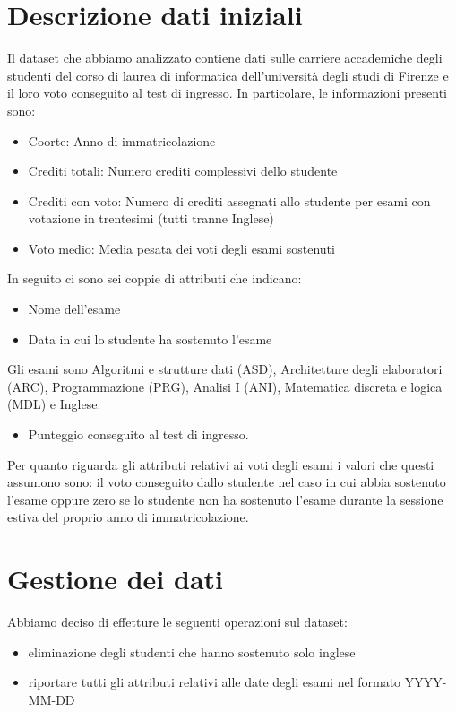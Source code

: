 \documentclass[12pt]{article}
\begin{document}
\section{Descrizione dati iniziali}
Il dataset che abbiamo analizzato contiene dati sulle carriere accademiche degli studenti del corso di laurea di informatica dell'università degli studi di Firenze e il loro voto conseguito 
al test di ingresso. 
In particolare, le informazioni presenti sono:
\begin{itemize}
	\item Coorte: Anno di immatricolazione
	\item Crediti totali: Numero crediti complessivi dello studente
	\item Crediti con voto: Numero di crediti assegnati allo studente per esami con votazione in trentesimi (tutti tranne Inglese)
	\item Voto medio: Media pesata dei voti degli esami sostenuti
\end{itemize}
In seguito ci sono sei coppie di attributi che indicano:
\begin{itemize}
	\item Nome dell'esame
	\item Data in cui lo studente ha sostenuto l'esame
\end{itemize}
Gli esami sono Algoritmi e strutture dati (ASD), Architetture degli elaboratori (ARC), Programmazione (PRG), Analisi I (ANI), Matematica discreta e logica (MDL) e Inglese.
\begin{itemize}
	\item Punteggio conseguito al test di ingresso.
\end{itemize}
Per quanto riguarda gli attributi relativi ai voti degli esami i valori che questi assumono sono:
il voto conseguito dallo studente nel caso in cui abbia sostenuto l'esame oppure
zero se lo studente non ha sostenuto l'esame durante la sessione estiva del proprio anno di immatricolazione.
\section{Gestione dei dati}
Abbiamo deciso di effetture le seguenti operazioni sul dataset:
\begin{itemize}
	\item eliminazione degli studenti che hanno sostenuto solo inglese
	\item riportare tutti gli attributi relativi alle date degli esami nel formato YYYY-MM-DD
\end{itemize}
\end{document}
